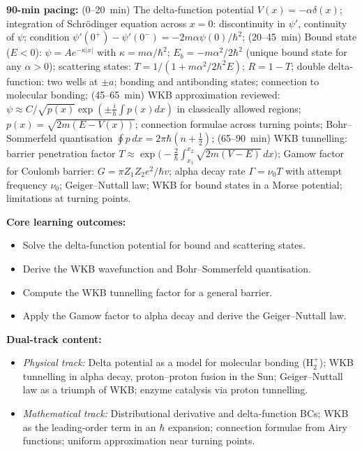 \documentclass[11pt,a4paper]{article}
\begin{document}
\begin{tcolorbox}[modulebox, title={Module~I.4 / L12: Delta-Function Potential and WKB Tunnelling}]
\textbf{90-min pacing:} (0--20~min) The delta-function potential $V(x)=-\alpha\delta(x)$;
integration of Schr\"odinger equation across $x=0$: discontinuity in $\psi'$,
continuity of $\psi$; condition $\psi'(0^+)-\psi'(0^-)=-2m\alpha\psi(0)/\hbar^2$;
(20--45~min) Bound state ($E<0$): $\psi=Ae^{-\kappa|x|}$ with $\kappa=m\alpha/\hbar^2$;
$E_b=-m\alpha^2/2\hbar^2$ (unique bound state for any $\alpha>0$);
scattering states: $T=1/(1+m\alpha^2/2\hbar^2 E)$; $R=1-T$;
double delta-function: two wells at $\pm a$; bonding and antibonding states;
connection to molecular bonding;
(45--65~min) WKB approximation reviewed: $\psi\approx C/\sqrt{p(x)}\exp(\pm\tfrac{i}{\hbar}\int p(x)dx)$
in classically allowed regions; $p(x)=\sqrt{2m(E-V(x))}$;
connection formulae across turning points;
Bohr--Sommerfeld quantisation $\oint p\,dx=2\pi\hbar(n+\tfrac{1}{2})$;
(65--90~min) WKB tunnelling: barrier penetration factor
$T\approx\exp\bigl(-\tfrac{2}{\hbar}\int_{x_1}^{x_2}\sqrt{2m(V-E)}\,dx\bigr)$;
Gamow factor for Coulomb barrier: $G=\pi Z_1Z_2e^2/\hbar v$;
alpha decay rate $\Gamma=\nu_0 T$ with attempt frequency $\nu_0$; Geiger--Nuttall law;
WKB for bound states in a Morse potential; limitations at turning points.

\medskip\textbf{Core learning outcomes:}
\begin{itemize}[leftmargin=1.4em,topsep=2pt,itemsep=1pt]
  \item Solve the delta-function potential for bound and scattering states.
  \item Derive the WKB wavefunction and Bohr--Sommerfeld quantisation.
  \item Compute the WKB tunnelling factor for a general barrier.
  \item Apply the Gamow factor to alpha decay and derive the Geiger--Nuttall law.
\end{itemize}

\medskip\textbf{Dual-track content:}
\begin{itemize}[leftmargin=1.4em,topsep=2pt,itemsep=1pt]
  \item \textit{Physical track:} Delta potential as a model for molecular bonding (H$_2^+$);
    WKB tunnelling in alpha decay, proton--proton fusion in the Sun;
    Geiger--Nuttall law as a triumph of WKB; enzyme catalysis via proton tunnelling.
  \item \textit{Mathematical track:} Distributional derivative and delta-function BCs;
    WKB as the leading-order term in an $\hbar$ expansion;
    connection formulae from Airy functions; uniform approximation near turning points.
\end{itemize}


\end{tcolorbox}
\end{document}
